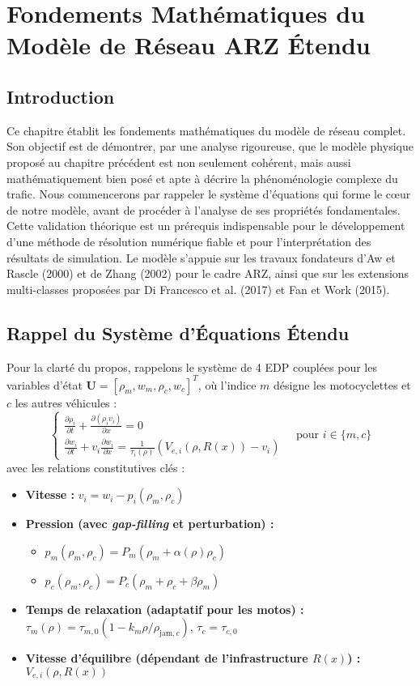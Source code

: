 \chapter{Fondements Mathématiques du Modèle de Réseau ARZ Étendu}
\label{chap:fondements_mathematiques}

\section{Introduction}
Ce chapitre établit les fondements mathématiques du modèle de réseau complet. Son objectif est de démontrer, par une analyse rigoureuse, que le modèle physique proposé au chapitre précédent est non seulement cohérent, mais aussi mathématiquement bien posé et apte à décrire la phénoménologie complexe du trafic. Nous commencerons par rappeler le système d'équations qui forme le cœur de notre modèle, avant de procéder à l'analyse de ses propriétés fondamentales. Cette validation théorique est un prérequis indispensable pour le développement d'une méthode de résolution numérique fiable et pour l'interprétation des résultats de simulation. Le modèle s'appuie sur les travaux fondateurs d'Aw et Rascle (2000) et de Zhang (2002) pour le cadre ARZ, ainsi que sur les extensions multi-classes proposées par Di Francesco et al. (2017) et Fan et Work (2015).

\section{Rappel du Système d'Équations Étendu}
Pour la clarté du propos, rappelons le système de 4 EDP couplées pour les variables d'état $\mathbf{U} = [\rho_m, w_m, \rho_c, w_c]^T$, où l'indice $m$ désigne les motocyclettes et $c$ les autres véhicules :
\[
\begin{cases}
\frac{\partial \rho_i}{\partial t} + \frac{\partial (\rho_i v_i)}{\partial x} = 0 \\
\frac{\partial w_i}{\partial t} + v_i \frac{\partial w_i}{\partial x} = \frac{1}{\tau_i(\rho)} (V_{e,i}(\rho, R(x)) - v_i)
\end{cases}
\quad \text{pour } i \in \{m, c\}
\]
avec les relations constitutives clés :
\begin{itemize}
    \item \textbf{Vitesse :} $v_i = w_i - p_i(\rho_m, \rho_c)$
    \item \textbf{Pression (avec \textit{gap-filling} et perturbation) :}
    \begin{itemize}
        \item $p_m(\rho_m, \rho_c) = P_m(\rho_m + \alpha(\rho) \rho_c)$
        \item $p_c(\rho_m, \rho_c) = P_c(\rho_m + \rho_c + \beta \rho_m)$
    \end{itemize}
    \item \textbf{Temps de relaxation (adaptatif pour les motos) :} $\tau_m(\rho) = \tau_{m,0} (1 - k_m \rho / \rho_{\text{jam},c})$, $\tau_c = \tau_{c,0}$
    \item \textbf{Vitesse d'équilibre (dépendant de l'infrastructure $R(x)$) :} $V_{e,i}(\rho, R(x))$
\end{itemize}

